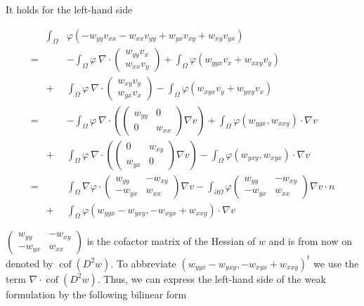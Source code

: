 \documentclass[a4paper,11pt]{article}
\newcommand{\myint}{\displaystyle\int}
\newcommand{\cof}{\operatorname{cof}}
\begin{document}

It holds for the left-hand side

\begin{eqnarray*}
	&\myint_{\Omega}& \varphi (-w_{yy} v_{xx}-w_{xx} v_{yy}+w_{yx} v_{xy} + w_{xy} v_{yx}) \\
	= && -\myint_{\Omega} \varphi \: \nabla \cdot \begin{pmatrix} w_{yy} v_x \\ w_{xx} v_y \end{pmatrix} + \myint_\Omega \varphi (w_{yyx}v_x + w_{xxy}v_y) \\
	&+&\myint_{\Omega} \varphi \: \nabla \cdot \begin{pmatrix} w_{xy} v_y \\ w_{yx} v_x \end{pmatrix}  - \myint_\Omega \varphi  (w_{xyx}v_y +  w_{yxy}v_x ) \\ 
	= && -\myint_{\Omega} \varphi\: \nabla \cdot \left( \begin{pmatrix} w_{yy} & 0 \\ 0 & w_{xx} \end{pmatrix} \nabla v \right) + \myint_\Omega \varphi \left(w_{yyx} , w_{xxy} \right) \cdot \nabla v\\ 
	&+ & \myint_{\Omega} \varphi\: \nabla \cdot \left( \begin{pmatrix} 0 & w_{xy}  \\ w_{yx} & 0 \end{pmatrix} \nabla v \right) - \myint_\Omega \varphi \left(w_{yxy} , w_{xyx} \right) \cdot \nabla v\\ 
	= && \myint_{\Omega} \nabla \varphi \cdot \begin{pmatrix} w_{yy} & -w_{xy} \\ -w_{yx} & w_{xx} \end{pmatrix} \nabla v - \myint_{\partial \Omega} \varphi \begin{pmatrix} w_{yy} & -w_{xy} \\ -w_{yx} & w_{xx} \end{pmatrix} \nabla v \cdot n \\
	&+ & \myint_\Omega \varphi \left( w_{yyx}-w_{yxy}, -w_{xyx} + w_{xxy} \right) \cdot \nabla v
\end{eqnarray*}

$\begin{pmatrix} w_{yy} & -w_{xy} \\ -w_{yx} & w_{xx} \end{pmatrix}$ is the cofactor matrix of the Hessian of $w$ and is from now on denoted by $\cof(D^2 w)$. 
To abbreviate $\left( w_{yyx}-w_{yxy}, -w_{xyx} + w_{xxy} \right)^t$ we use the term  $\nabla \cdot \cof(D^2 w)$.
Thus, we can express the left-hand side of the weak formulation by the following bilinear form
\end{document}
